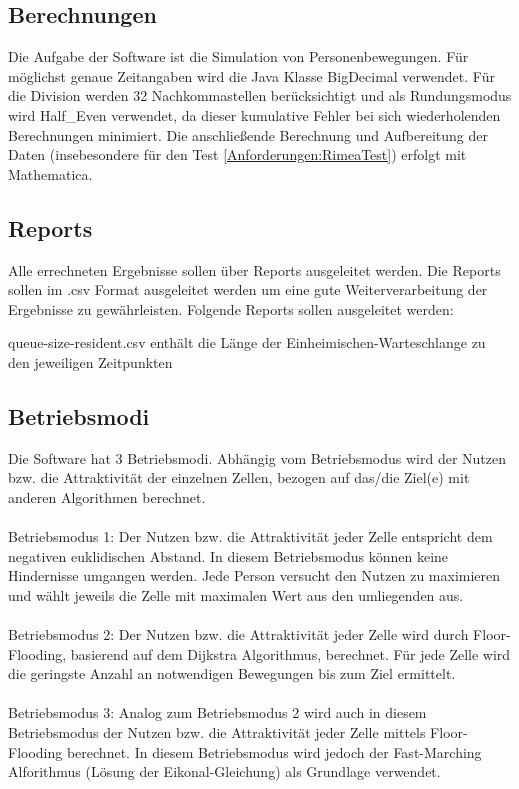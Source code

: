 \subsection{Berechnungen}
Die Aufgabe der Software ist die Simulation von Personenbewegungen. Für möglichst genaue Zeitangaben wird die Java Klasse BigDecimal verwendet. Für die Division werden 32 Nachkommastellen berücksichtigt und als Rundungsmodus wird Half\_Even verwendet, da dieser kumulative Fehler bei sich wiederholenden Berechnungen minimiert. Die anschließende Berechnung und Aufbereitung der Daten (insebesondere für den Test \ref{Anforderungen:RimeaTest}) erfolgt mit Mathematica.

\subsection{Reports}
Alle errechneten Ergebnisse sollen über Reports ausgeleitet werden. Die Reports sollen im .csv Format ausgeleitet werden um eine gute Weiterverarbeitung der Ergebnisse zu gewährleisten. Folgende Reports sollen ausgeleitet werden:
\begin{list}{•}
	    	\item queue-size-resident.csv enthält die Länge der Einheimischen-Warteschlange zu den jeweiligen Zeitpunkten
    	
    \end{list}
\subsection{Betriebsmodi}
\label{AnforderungenBetriebsmodi}

Die Software hat 3 Betriebsmodi. Abhängig vom Betriebsmodus wird der Nutzen bzw. die Attraktivität der einzelnen Zellen, bezogen auf das/die Ziel(e) mit anderen Algorithmen berechnet. \\
\\
Betriebsmodus 1: Der Nutzen bzw. die Attraktivität jeder Zelle entspricht dem negativen euklidischen Abstand. In diesem Betriebsmodus können keine Hindernisse umgangen werden. Jede Person versucht den Nutzen zu maximieren und wählt jeweils die Zelle mit maximalen Wert aus den umliegenden aus.\\
\\
Betriebsmodus 2: Der Nutzen bzw. die Attraktivität jeder Zelle wird durch Floor-Flooding, basierend auf dem Dijkstra Algorithmus, berechnet. Für jede Zelle wird die geringste Anzahl an notwendigen Bewegungen bis zum Ziel ermittelt. \\
\\
Betriebsmodus 3: Analog zum Betriebsmodus 2 wird auch in diesem Betriebsmodus der Nutzen bzw. die Attraktivität jeder Zelle mittels Floor-Flooding berechnet. In diesem Betriebsmodus wird jedoch der Fast-Marching Alforithmus (Lösung der Eikonal-Gleichung) als Grundlage verwendet.

